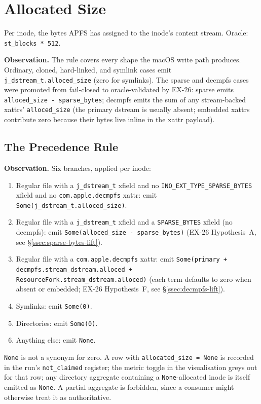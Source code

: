 \section{Allocated Size}

Per inode, the bytes APFS has assigned to the inode's content
stream. Oracle: \texttt{st\_blocks * 512}.

\textbf{Observation.} The rule covers every shape the macOS write
path produces. Ordinary, cloned, hard-linked, and symlink cases
emit \texttt{j\_dstream\_t.alloced\_size} (zero for symlinks). The
sparse and decmpfs cases were promoted from fail-closed to
oracle-validated by EX-26: sparse emits
\texttt{alloced\_size - sparse\_bytes}; decmpfs emits the sum of
any stream-backed xattrs' \texttt{alloced\_size} (the primary
dstream is usually absent; embedded xattrs contribute zero because
their bytes live inline in the xattr payload).

\subsection{The Precedence Rule}

\textbf{Observation.} Six branches, applied per inode:

\begin{enumerate}
  \item Regular file with a \texttt{j\_dstream\_t} xfield and no
    \texttt{INO\_EXT\_TYPE\_SPARSE\_BYTES} xfield and no
    \texttt{com.apple.decmpfs} xattr: emit
    \texttt{Some(j\_dstream\_t.alloced\_size)}.
  \item Regular file with a \texttt{j\_dstream\_t} xfield and a
    \texttt{SPARSE\_BYTES} xfield (no decmpfs): emit
    \texttt{Some(alloced\_size - sparse\_bytes)} (EX-26 Hypothesis~A,
    see §\ref{ssec:sparse-bytes-lift}).
  \item Regular file with a \texttt{com.apple.decmpfs} xattr: emit
    \texttt{Some(primary + decmpfs.stream\_dstream.alloced +
    ResourceFork.stream\_dstream.alloced)} (each term defaults to
    zero when absent or embedded; EX-26 Hypothesis~F, see
    §\ref{ssec:decmpfs-lift}).
  \item Symlinks: emit \texttt{Some(0)}.
  \item Directories: emit \texttt{Some(0)}.
  \item Anything else: emit \texttt{None}.
\end{enumerate}

\texttt{None} is not a synonym for zero. A row with
\texttt{allocated\_size = None} is recorded in the run's
\texttt{not\_claimed} register; the metric toggle in the
visualisation greys out for that row; any directory aggregate
containing a \texttt{None}-allocated inode is itself emitted as
\texttt{None}. A partial aggregate is forbidden, since a consumer
might otherwise treat it as authoritative.

